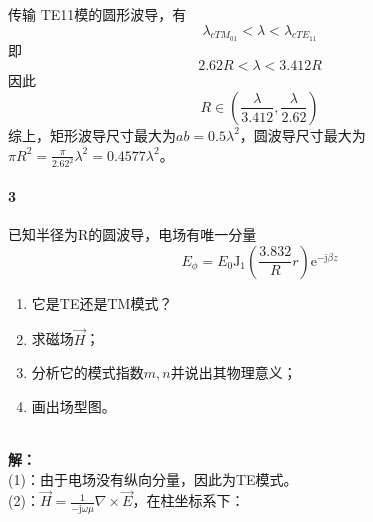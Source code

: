         传输 TE{\scriptsize 11}模的圆形波导，有
        \begin{equation}
            \lambda_{c TM_{01}}<\lambda<\lambda_{c TE_{11}}
        \end{equation}
        即
        \begin{equation*}
            2.62R<\lambda<3.412R
        \end{equation*}
        因此
        \begin{equation*}
            R\in\left(\frac{\lambda}{3.412},\frac{\lambda}{2.62}\right)
        \end{equation*}
        综上，矩形波导尺寸最大为$ab=0.5 \lambda^2$，圆波导尺寸最大为$\pi R^2=\frac{\pi}{2.62^2}\lambda^2=0.4577\lambda^2$。
    \\[15pt]
    \paragraph{3}已知半径为R的圆波导，电场有唯一分量
    \begin{equation*}
        E_\phi=E_0 \mathrm{J}_1\left(\frac{3.832}{R}r\right)\mathrm{e}^{-\mathrm{j}\beta z}
    \end{equation*}
    \begin{enumerate}
        \renewcommand*\labelenumi{(\theenumi)} %
        \item 它是TE还是TM模式？
        \item 求磁场$\vec{H}$；
        \item 分析它的模式指数$m,n$并说出其物理意义；
        \item 画出场型图。
    \end{enumerate}
    ~\\{\bfseries 解：}\\
    (1)：由于电场没有纵向分量，因此为TE模式。\\
    (2)：$\vec{H}=\frac{1}{-\mathrm{j}\omega\mu}\nabla\times\vec{E}$，在柱坐标系下：

